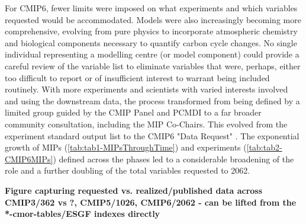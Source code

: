 \documentclass[gmd, preprint]{copernicus}
\newcommand{\mycomment}[1]{}
\def\cred#1{{\color{red}#1}}
\begin{document}
For CMIP6, fewer limits were imposed on what experiments and which variables requested would be accommodated. Models were also increasingly becoming more comprehensive, evolving from pure physics to incorporate atmospheric chemistry and biological components necessary to quantify carbon cycle changes. No single individual representing a modelling centre (or model component) could provide a careful review of the variable list to eliminate variables that were, perhaps, either too difficult to report or of insufficient interest to warrant being included routinely. With more experiments and scientists with varied interests involved and using the downstream data, the process transformed from being defined by a limited group guided by the CMIP Panel and PCMDI to a far broader community consultation, including the MIP Co-Chairs. This evolved from the experiment standard output list to the CMIP6 "Data Request" \citep{juckes_cmip6_2020}. The exponential growth of MIPs (\autoref{tab:tab1-MIPsThroughTime}) and experiments (\autoref{tab:tab2-CMIP6MIPs}) defined across the phases led to a considerable broadening of the role and a further doubling of the total variables requested to 2062.

\cred{\textbf{Figure capturing requested vs. realized/published data across CMIP3/362 vs ?, CMIP5/1026, CMIP6/2062 - can be lifted from the *-cmor-tables/ESGF indexes directly}}

\mycomment{
The CMIP6 "data request" \citep{juckes_cmip6_2020} was the most comprehensively outlined preceded by three decades of evolution in climate model understanding. This history underpinned the development of the standard experimental protocols 
\citet{gates_amip_1991} - AMIP1
\citet{gates_amip_1993} - AMIP History Archive
\citet{gates_amip_1994} - AMIP Ensemble
\citet{gleckler_amip_1996} - AMIP 7 monthly mean and six-hourly output, plus ensembles/AMIP 2
\citet{gleckler_amip_1996-1} - AMIP number 8, STANDARD OUTPUT low and high frequency (6-hr)
https://pcmdi.llnl.gov/mips/amip/OUTPUT/WGNEDIAGS/index.html
\citet{taylor_pcmdi_2009}
\citet{taylor_pcmdi_2013}
\citet{juckes_baseline_2024}

FANGIO not multi-year (perpetual July)/January; AMIP1 success, multi-year SST/sea-ice (Russians and Chinese); AMIP2 next-level output, more high frequency data, mean products (covariances; u/v-prime overbar - on the fly calculation) monthly mean timeseries (Boer \& Lambert 2008, clim dyn - relationship to Lorenz energy cycle)
CMIP2: https://pcmdi.llnl.gov/mips/cmip2/
CMIP3: https://pcmdi.llnl.gov/mips/cmip3/experiment.html
CMIP5: https://pcmdi.llnl.gov/mips/cmip5/requirements.html
}
\end{document}
